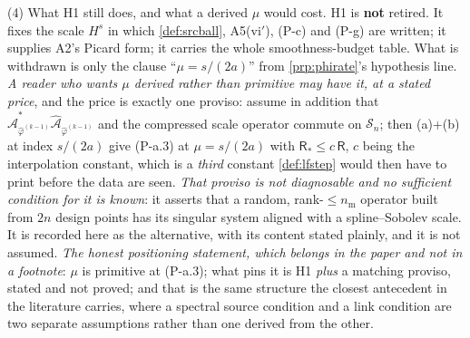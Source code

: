 \begin{remark}
(4) What H1 still does, and what a derived $\mu$ would cost. H1 is \textbf{not} retired. It fixes
the scale $H^{s}$ in which \cref{def:srcball}, A5(vi$'$), (P-c) and (P-g) are written; it supplies A2's
Picard form; it carries the whole smoothness-budget table. What is withdrawn is only the clause
``$\mu=s/(2a)$'' from \cref{prp:phirate}'s hypothesis line. \emph{A reader who wants $\mu$ derived rather
than primitive may have it, at a stated price}, and the price is exactly one proviso: assume in addition
that $\hat{\mathcal A}^{\ast}_{\hat\varphi^{(k-1)}}\hat{\mathcal A}_{\hat\varphi^{(k-1)}}$ and the
compressed scale operator commute on $\mathcal S_n$; then (a)+(b) at index $s/(2a)$ give (P-a.3) at
$\mu=s/(2a)$ with $\mathsf R_\ast\le c\,\mathsf R$, $c$ being the interpolation constant, which is a
\emph{third} constant \cref{def:lfstep} would then have to print before the data are seen. \emph{That
proviso is not diagnosable and no sufficient condition for it is known}: it asserts that a random,
rank-$\le n_{\mathrm m}$ operator built from $2n$ design points has its singular system aligned with a
spline--Sobolev scale. It is recorded here as the alternative, with its content stated plainly, and it is
not assumed. \emph{The honest positioning statement, which belongs in the paper and not in a footnote}:
$\mu$ is primitive at (P-a.3); what pins it is H1 \emph{plus} a matching proviso, stated and not proved;
and that is the same structure the closest antecedent in the literature carries, where a spectral source
condition and a link condition are two separate assumptions rather than one derived from the other.


\end{remark}

